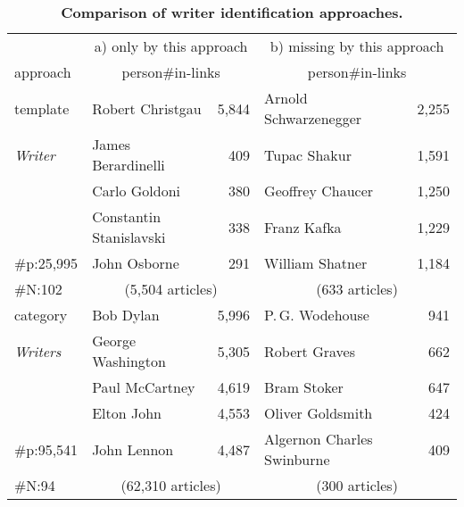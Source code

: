 \documentclass[a4paper,12pt]{scrartcl}
\begin{document}
%
%
\newcommand{\persct}[1]{\multicolumn{2}{c}{(#1 articles)}}
\begin{table}
  \caption{\bf Comparison of writer identification approaches.}
  \label{tab:topfive_combined}
  \begin{tabular}{@{}p{19mm}lrlr@{}}
    \toprule
    & \multicolumn{2}{c}{a) only by this approach} & \multicolumn{2}{c}{b) missing by this approach} \\
    \cmidrule(rl){2-3}\cmidrule(l){4-5}
    approach & \multicolumn{2}{c}{person\hfill\#in-links} & \multicolumn{2}{c}{person\hfill\#in-links}\\
    \midrule
    template          &Robert Christgau        &5,844 &Arnold Schwarzenegger &2,255	\\
    \emph{Writer}     &James Berardinelli      &409   &Tupac Shakur          &1,591	\\
                      &Carlo Goldoni           &380   &Geoffrey Chaucer      &1,250	\\
                      &Constantin Stanislavski &338   &Franz Kafka           &1,229	\\
    \#p:\hfill 25,995 &John Osborne            &291   &William Shatner       &1,184	\\
    \#N:\hfill 102    &\persct{5,504}          & \persct{633}\\ %
    \midrule
    category          &Bob Dylan         &5,996 &P.\,G. Wodehouse           &941	\\
    \emph{Writers}    &George Washington &5,305 &Robert Graves              &662	\\
                      &Paul McCartney    &4,619 &Bram Stoker                &647	\\
                      &Elton John        &4,553 &Oliver Goldsmith           &424	\\
    \#p:\hfill 95,541 &John Lennon       &4,487 &Algernon Charles Swinburne &409	\\
    \#N:\hfill 94     &\persct{62,310}   & \persct{300}\\ %
    \midrule

\end{tabular}
\end{table}
\end{document}
